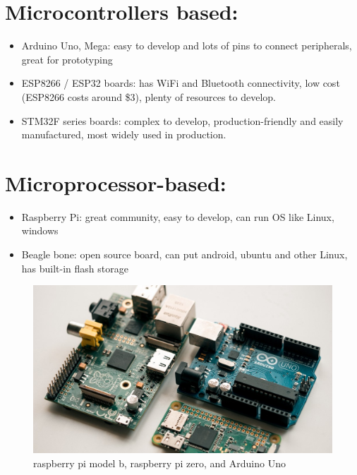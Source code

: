 \documentclass[12pt]{report}
\begin{document}
\section{Microcontrollers based:}

\begin{itemize}
    \item Arduino Uno, Mega: easy to develop and lots of pins to connect peripherals, great for prototyping
    \item ESP8266 / ESP32 boards: has WiFi and Bluetooth connectivity, low cost (ESP8266 costs around \$3), plenty of resources to develop.
    \item  STM32F series boards: complex to develop, production-friendly and easily manufactured, most widely used in production.
\end{itemize}

\section{Microprocessor-based:}

\begin{itemize}
    \item Raspberry Pi: great community, easy to develop, can run OS like Linux, windows
    \item Beagle bone: open source board, can put android, ubuntu and other Linux, has built-in flash storage
\end{itemize}

\begin{figure}[!ht]
    \centering
    \includegraphics[trim={1cm, 0cm, 0cm, 0cm}, width=\textwidth, clip]{figs/hardware_devices.jpg}
    \caption{raspberry pi model b, raspberry pi zero, and Arduino Uno}
\end{figure}
\end{document}
